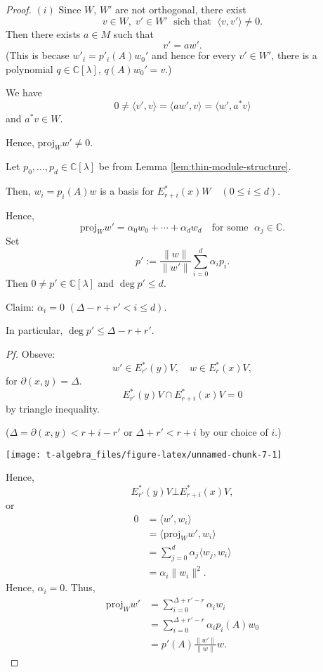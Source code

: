 \documentclass[
]{book}
\theoremstyle{definition}
\theoremstyle{definition}
\theoremstyle{definition}
\theoremstyle{definition}
\theoremstyle{remark}
\begin{document}
\begin{proof}
\((i)\) Since \(W\), \(W'\) are not orthogonal, there exist
\[v\in W, \; v'\in W' \; \text{ sich that }\; \langle v, v'\rangle \neq 0.\]
Then there exists \(a\in M\) such that
\[v' = aw'.\]
(This is becase \(w'_i = p'_i(A)w_0'\) and hence for every \(v'\in W'\), there is a polynomial \(q\in \mathbb{C}[\lambda]\), \(q(A)w_0' = v\).)

We have
\[0\neq \langle v', v\rangle = \langle aw', v\rangle = \langle w', a^*v\rangle\]
and \(a^*v\in W\).

Hence, \(\mathrm{proj}_{W} w' \neq 0\).

Let \(p_0, \ldots, p_d\in \mathbb{C}[\lambda]\) be from Lemma \ref{lem:thin-module-structure}.

Then, \(w_i = p_i(A)w\) is a basis for \(E^*_{r+i}(x)W \quad (0\leq i\leq d)\).

Hence,
\[\mathrm{proj}_{W}w' = \alpha_0w_0 + \cdots + \alpha_dw_d \quad \text{for some }\; \alpha_j\in \mathbb{C}.\]
Set
\[p' := \frac{\|w\|}{\|w'\|}\sum_{i=0}^d \alpha_ip_i.\]
Then \(0\neq p'\in \mathbb{C}[\lambda]\) and \(\deg p' \leq d\).

Claim: \(\alpha_i = 0\) \((\Delta - r + r' < i\leq d)\).

In particular, \(\deg p' \leq \Delta - r + r'\).

\emph{Pf.} Obseve:
\[w'\in E^*_{r'}(y)V, \quad w \in E^*_r(x)V,\]
for \(\partial(x,y) = \Delta\).
\[E^*_{r'}(y)V \cap E^*_{r+i}(x)V = 0\]
by triangle inequality.

(\(\Delta = \partial(x,y) < r+i - r'\) or \(\Delta + r' < r + i\) by our choice of \(i\).)

\begin{center}\texttt{[image: t-algebra\_files/figure-latex/unnamed-chunk-7-1]} \end{center}

Hence,
\[E^*_{r'}(y)V \bot E^*_{r+i}(x)V,\]
or
\begin{align}
0 & = \langle w', w_i\rangle \\
& = \langle \mathrm{proj}_{W}w', w_i\rangle\\
& = \sum_{j=0}^d\alpha_j\langle w_j, w_i\rangle\\
& = \alpha_i\|w_i\|^2.
\end{align}
Hence, \(\alpha_i = 0\).
Thus,
\begin{align}
\mathrm{proj}_{W}w' & = \sum_{i=0}^{\Delta + r' - r}\alpha_iw_i\\
& = \sum_{i=0}^{\Delta + r' - r}\alpha_ip_i(A)w_0\\
& = p'(A)\frac{\|w'\|}{\|w\|}w.
\end{align}


\end{proof}
\end{document}
